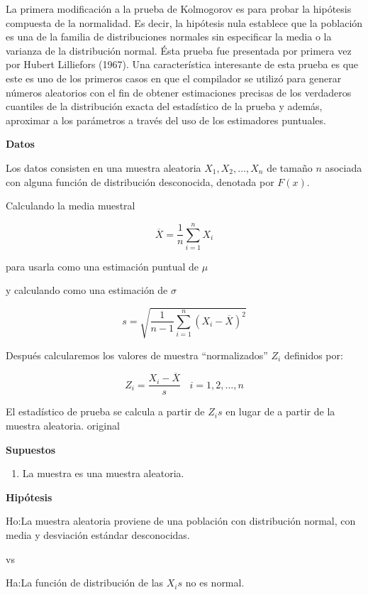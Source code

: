 \documentclass[a4paper,oneside,openany]{book}
\providecommand{\tightlist}{%
  \setlength{\itemsep}{0pt}\setlength{\parskip}{0pt}}
\begin{document}
La primera modificación a la prueba de Kolmogorov es para probar la
hipótesis compuesta de la normalidad. Es decir, la hipótesis nula
establece que la población es una de la familia de distribuciones
normales sin especificar la media o la varianza de la distribución
normal. Ésta prueba fue presentada por primera vez por Hubert Lilliefors
(1967). Una característica interesante de esta prueba es que este es uno
de los primeros casos en que el compilador se utilizó para generar
números aleatorios con el fin de obtener estimaciones precisas de los
verdaderos cuantiles de la distribución exacta del estadístico de la
prueba y además, aproximar a los parámetros a través del uso de los
estimadores puntuales.

\textbf{Datos}

Los datos consisten en una muestra aleatoria
\(X_{1},X_{2},\ldots,X_{n}\) de tamaño \(n\) asociada con alguna función
de distribución desconocida, denotada por \(F(x)\).

Calculando la media muestral

\[\overline{X}=\frac{1}{n}\sum_{i=1}^{n}X_{i}\]

para usarla como una estimación puntual de \(\mu\)

y calculando como una estimación de \(\sigma\)

\[s=\sqrt{\frac{1}{n-1}\sum_{i=1}^{n}(X_{i}-\overline{X})^2}\]

Después calcularemos los valores de muestra ``normalizados'' \(Z_{i}\)
definidos por:

\[Z_{i}=\frac{X_{i}-\overline{X}}{s} \ \ \ \ i=1,2,\ldots,n\]

El estadístico de prueba se calcula a partir de \(Z_{i}s\) en lugar de a
partir de la muestra aleatoria. original

\textbf{Supuestos}

\begin{enumerate}
\def\labelenumi{\arabic{enumi})}
\tightlist
\item
  La muestra es una muestra aleatoria.
\end{enumerate}

\textbf{Hipótesis}

\begin{center}

Ho:La muestra aleatoria proviene de una población con distribución normal, con media y desviación estándar desconocidas.


vs

Ha:La función de distribución de las $X_{i}s$ no es normal.

\end{center}
\end{document}
